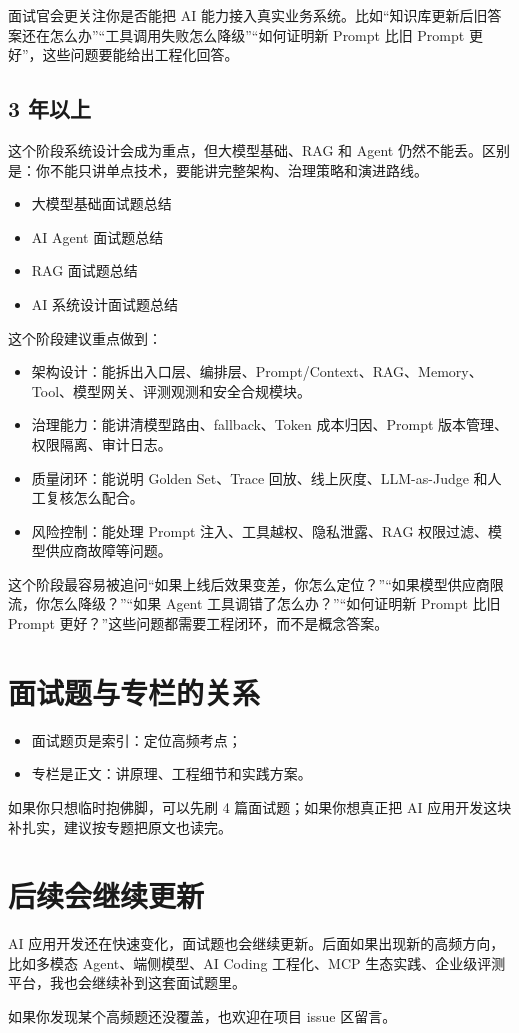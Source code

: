 \documentclass[9pt,a4paper,twocolumn]{ctexart}
\begin{document}
面试官会更关注你是否能把 AI 能力接入真实业务系统。比如“知识库更新后旧答案还在怎么办”“工具调用失败怎么降级”“如何证明新 Prompt 比旧 Prompt 更好”，这些问题要能给出工程化回答。



\subsection*{3 年以上}


这个阶段系统设计会成为重点，但大模型基础、RAG 和 Agent 仍然不能丢。区别是：你不能只讲单点技术，要能讲完整架构、治理策略和演进路线。


\begin{itemize}[itemsep=1pt, topsep=2pt]
  \item 大模型基础面试题总结
  \item AI Agent 面试题总结
  \item RAG 面试题总结
  \item AI 系统设计面试题总结
\end{itemize}


这个阶段建议重点做到：


\begin{itemize}[itemsep=1pt, topsep=2pt]
  \item 架构设计：能拆出入口层、编排层、Prompt/Context、RAG、Memory、Tool、模型网关、评测观测和安全合规模块。
  \item 治理能力：能讲清模型路由、fallback、Token 成本归因、Prompt 版本管理、权限隔离、审计日志。
  \item 质量闭环：能说明 Golden Set、Trace 回放、线上灰度、LLM-as-Judge 和人工复核怎么配合。
  \item 风险控制：能处理 Prompt 注入、工具越权、隐私泄露、RAG 权限过滤、模型供应商故障等问题。
\end{itemize}


这个阶段最容易被追问“如果上线后效果变差，你怎么定位？”“如果模型供应商限流，你怎么降级？”“如果 Agent 工具调错了怎么办？”“如何证明新 Prompt 比旧 Prompt 更好？”这些问题都需要工程闭环，而不是概念答案。



\section*{面试题与专栏的关系}

\begin{itemize}[itemsep=1pt, topsep=2pt]
  \item 面试题页是索引：定位高频考点；
  \item 专栏是正文：讲原理、工程细节和实践方案。
\end{itemize}


如果你只想临时抱佛脚，可以先刷 4 篇面试题；如果你想真正把 AI 应用开发这块补扎实，建议按专题把原文也读完。



\section*{后续会继续更新}


AI 应用开发还在快速变化，面试题也会继续更新。后面如果出现新的高频方向，比如多模态 Agent、端侧模型、AI Coding 工程化、MCP 生态实践、企业级评测平台，我也会继续补到这套面试题里。



如果你发现某个高频题还没覆盖，也欢迎在项目 issue 区留言。
\end{document}
